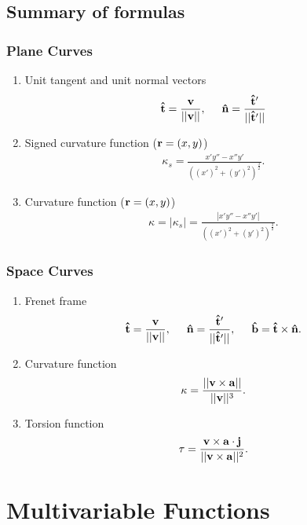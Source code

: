 \documentclass[12pt,letterpaper,reqno]{article}
\numberwithin{equation}{section}
\newcommand{\bv}{{\bf v}}
\newcommand{\ba}{{\bf a}}
\newcommand{\bbr}{{\bf r}}
\newcommand{\ut}{{\bf {\hat{t}}}}
\newcommand{\un}{{\bf {\hat{n}}}}
\newcommand{\ub}{{\bf {\hat{b}}}}
\begin{document}
{\subsection{Summary of formulas}
\subsubsection{Plane Curves}
\begin{enumerate}
	\item Unit tangent and unit normal vectors 
	\begin{align*}
		\ut=\frac{\bv}{||\bv||}, \hspace{0.5cm} \un = \frac{\ut'}{||\ut'||}
	\end{align*}
	\item Signed curvature function ($\bbr=(x,y)$)
	\begin{align*}
		\kappa_s=\frac{x'y''-x''y'}{((x')^2+(y')^2)^\frac{3}{2}}.
	\end{align*} 
	\item Curvature function ($\bbr=(x,y)$)
	\begin{align*}
		\kappa=|\kappa_s|=\frac{|x'y''-x''y'|}{((x')^2+(y')^2)^\frac{3}{2}}.
	\end{align*}
\end{enumerate}

\subsubsection{Space Curves}
\begin{enumerate}
	\item Frenet frame
	\begin{align*}
		\ut=\frac{\bv}{||\bv||}, \hspace{0.5cm} \un = \frac{\ut'}{||\ut'||}, \hspace{0.5cm} \ub=\ut \times \un.
	\end{align*}
	\item Curvature function
	\begin{align*}
		\kappa=\frac{||\bv \times \ba||}{||\bv||^3}.
	\end{align*}
	\item Torsion function
	\begin{align*}
		\tau=\frac{\bv \times \ba \cdot {\bf j}}{||\bv \times \ba||^2}.
	\end{align*}
\end{enumerate}

\section{Multivariable Functions}
}
\end{document}
